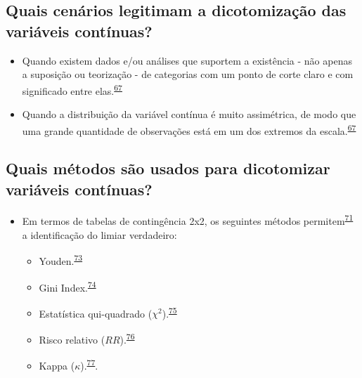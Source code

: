 \documentclass[
  a4paper,
]{book}
\begin{document}
\hypertarget{quais-cenuxe1rios-legitimam-a-dicotomizauxe7uxe3o-das-variuxe1veis-contuxednuas}{%
\subsection{Quais cenários legitimam a dicotomização das variáveis contínuas?}\label{quais-cenuxe1rios-legitimam-a-dicotomizauxe7uxe3o-das-variuxe1veis-contuxednuas}}

\begin{itemize}
\item
  Quando existem dados e/ou análises que suportem a existência - não apenas a suposição ou teorização - de categorias com um ponto de corte claro e com significado entre elas.\textsuperscript{\protect\hyperlink{ref-MacCallum2002}{67}}
\item
  Quando a distribuição da variável contínua é muito assimétrica, de modo que uma grande quantidade de observações está em um dos extremos da escala.\textsuperscript{\protect\hyperlink{ref-MacCallum2002}{67}}
\end{itemize}

\hypertarget{quais-muxe9todos-suxe3o-usados-para-dicotomizar-variuxe1veis-contuxednuas}{%
\subsection{Quais métodos são usados para dicotomizar variáveis contínuas?}\label{quais-muxe9todos-suxe3o-usados-para-dicotomizar-variuxe1veis-contuxednuas}}

\begin{itemize}
\item
  Em termos de tabelas de contingência 2x2, os seguintes métodos permitem\textsuperscript{\protect\hyperlink{ref-Prince2017}{71}} a identificação do limiar verdadeiro:

  \begin{itemize}
  \item
    Youden.\textsuperscript{\protect\hyperlink{ref-YOUDEN1950}{73}}
  \item
    Gini Index.\textsuperscript{\protect\hyperlink{ref-strobl2007}{74}}
  \item
    Estatística qui-quadrado (\(\chi^2\)).\textsuperscript{\protect\hyperlink{ref-pearson1900}{75}}
  \item
    Risco relativo (\(RR\)).\textsuperscript{\protect\hyperlink{ref-Greiner2000}{76}}
  \item
    Kappa (\(\kappa\)).\textsuperscript{\protect\hyperlink{ref-fleiss1971}{77}}.
  \end{itemize}
\end{itemize}
\end{document}

